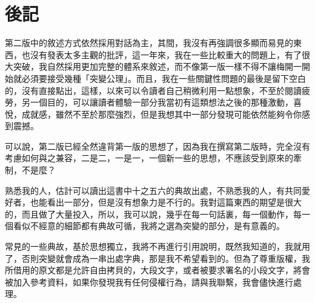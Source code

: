 \chapter{後記}
第二版中的敘述方式依然採用對話為主，其間，我沒有再強調很多顯而易見的東西，也沒有發表太多主觀的批評，這一年來，我在一些比較重大的問題上，有了很大突破，我自然採用更加完整的體系來敘述，而不像第一版一樣不得不讓梅開一開始就必須要接受幾種「突變公理」。而且，我在一些關鍵性問題的最後是留下空白的，沒有直接點出，這樣，以來可以令讀者自己稍微利用一點想象，不至於閱讀疲勞，另一個目的，可以讓讀者體驗一部分我當初有這類想法之後的那種激動，喜悅，成就感，雖然不至於那麼強烈，但是我想其中一部分發現可能依然能夠令你感到震撼。

可以說，第二版已經全然違背第一版的思想了，因為我在撰寫第二版時，完全沒有考慮如何與之兼容，二是二，一是一，一個新一些的思想，不應該受到原來的牽制，不是麼？

熟悉我的人，估計可以讀出這書中十之五六的典故出處，不熟悉我的人，有共同愛好者，也能看出一部分，但是沒有想象力是不行的。我對這篇東西的期望是很大的，而且做了大量投入，所以，我可以說，幾乎在每一句話裏，每一個動作，每一個看似不經意的細節都有典故可循，我將之選為突變的部分，是有意義的。

常見的一些典故，基於思想獨立，我將不再進行引用說明，既然我知道的，我就用了，否則突變就會成為一串出處字典，那是我不希望看到的。但為了尊重版權，我所借用的原文都是允許自由拷貝的，大段文字，或者被要求署名的小段文字，將會被加入參考資料，如果你發現我有任何侵權行為，請與我聯繫，我會儘快進行處理。

